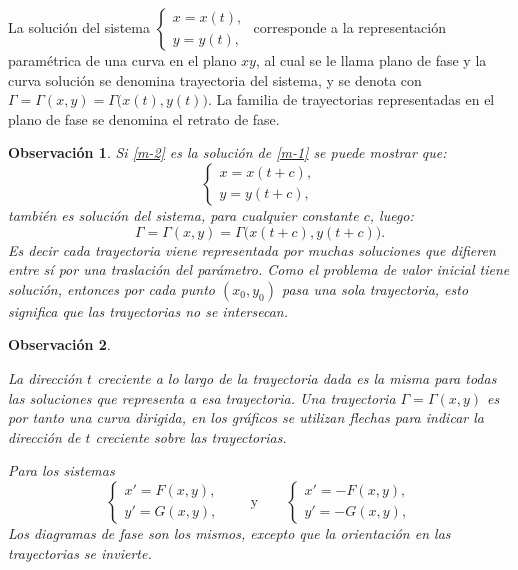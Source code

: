 \documentclass[a5paper,doc,10pt,noapacite]{apa6}
\newcommand{\yds}{\qquad\text{y}\qquad}
\newtheorem{observ}{Observación}
\begin{document}
{{La solución del sistema \(\begin{cases}	x=x(t),	\\		y = y(t),	\end{cases}\) \hspace{-1em} corresponde a la representación paramétrica de una curva en el plano \(xy\), al cual se le llama plano de fase y la curva solución se denomina trayectoria del sistema, y se denota con \(\Gamma=\Gamma(x,y)=\Gamma\big(x(t),y(t)\big)\). La familia de trayectorias representadas en el plano de fase se denomina el retrato de fase.
	
\begin{observ}
	Si \eqref{m-2} es la solución de \eqref{m-1} se puede mostrar que:
	\begin{equation}\label{m-2}
	\begin{cases}
		x=x(t+c),	
		 \\
		y = y(t+c),
	\end{cases}
	\end{equation}
	también es solución del sistema, para cualquier constante \(c\), luego:
	\[
	\Gamma=\Gamma(x,y)=\Gamma\big(x(t+c),y(t+c)\big).
	\]
	Es decir cada trayectoria viene representada por muchas soluciones que difieren entre sí por una traslación del parámetro. Como el problema de valor inicial tiene solución, entonces por cada punto \((x_0,y_0)\) pasa una sola trayectoria, esto significa que las trayectorias no se intersecan.
\end{observ}

\begin{observ}\quad
	\begin{APAenumerate}
		\item La dirección \(t\) creciente a lo largo de la trayectoria dada es la misma para todas las soluciones que representa a esa trayectoria. Una trayectoria \(\Gamma=\Gamma(x,y)\)  es por tanto una curva dirigida, en los gráficos se utilizan flechas para indicar la dirección de \(t\) creciente sobre las trayectorias.
		
		\item Para los sistemas
		\[
			\begin{cases}
			x' = F(x,y),
			 \\
			y' = G(x,y),
			\end{cases}
			\yds
			\begin{cases}
			x' = -F(x,y),
			 \\
			y' = -G(x,y),
			\end{cases}
		\]
		Los diagramas de fase son los mismos, excepto que la orientación en las trayectorias se invierte.



\end{APAenumerate}
\end{observ}}}
\end{document}
